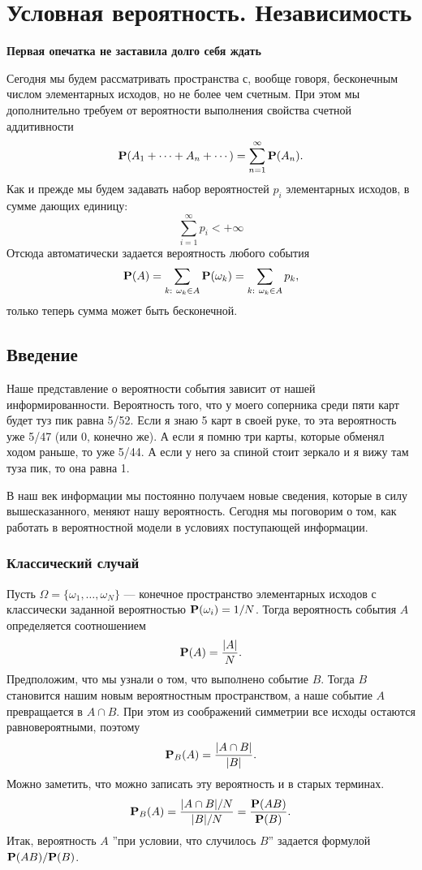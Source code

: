 \documentclass[11 pt,russian]{article}
\begin{document}
\newenvironment{enumerate*}%
  {\begin{enumerate}%
    \setlength{\itemsep}{1pt}%
    \setlength{\parskip}{1pt}}%
  {\end{enumerate}}
  \newtheorem{Th}{Теорема}
    \newtheorem{Lemm}{Лемма}
  \theoremstyle{definition}
  \newtheorem{Rem}{Замечание}
  \newtheorem{Que}{Вопрос}
  \newtheorem{Exam}{Пример}
    \newtheorem{Def}{Определение}
\section{Условная вероятность. Независимость}
{\bf Первая опечатка не заставила долго себя ждать}

Сегодня мы будем рассматривать пространства с, вообще говоря, бесконечным числом элементарных исходов, но не более чем счетным. 
При этом мы дополнительно требуем от вероятности выполнения свойства счетной аддитивности
$$
{\bf P}(A_1 + \dotsb + A_n +\dotsb) = \sum_{n=1}^{\infty} {\bf P}(A_n). 
$$
Как и прежде мы будем задавать набор вероятностей $p_i$ элементарных исходов, в сумме дающих единицу:
$$
\sum_{i=1}^{\infty} p_i < +\infty
$$
Отсюда автоматически задается вероятность любого события
$$
{\bf P}(A) = \sum_{k:\ \omega_k\in A} {\bf P}(\omega_k) = \sum_{k:\ \omega_k\in A} p_k,
$$
только теперь сумма может быть бесконечной.
\subsection{Введение}
Наше представление о вероятности события зависит от нашей информированности. Вероятность того, что у моего соперника среди пяти карт будет туз пик равна 5/52. Если я знаю 5 карт в своей руке, то эта вероятность уже 5/47 (или 0, конечно же). А если я помню три карты, которые обменял ходом раньше, то уже 5/44. А если у него за спиной стоит зеркало и я вижу там туза пик, то она равна 1. 

В наш век информации мы постоянно получаем новые сведения, которые в силу вышесказанного, меняют нашу вероятность. Сегодня мы поговорим о том, как работать в вероятностной модели в условиях поступающей информации.
\subsubsection{Классический случай}
Пусть $\Omega=\{\omega_1,\dotsc,\omega_N\}$ --- конечное пространство элементарных исходов с классически заданной вероятностью ${\bf P}(\omega_i) = 1/N$. Тогда вероятность события $A$ определяется соотношением
$$
{\bf P}(A) = \frac{|A|}{N}.
$$
Предположим, что мы узнали о том, что выполнено событие $B$. Тогда $B$ становится нашим новым вероятностным пространством, а наше событие $A$ превращается в $A\cap B$. При этом из соображений симметрии все исходы остаются равновероятными, поэтому
$$
{\bf P}_B(A) = \frac{|A\cap B|}{|B|}.
$$ 
Можно заметить, что можно записать эту вероятность и в старых терминах.
$$
{\bf P}_{B}(A) =  \frac{|A\cap B|/N}{|B|/N} =  \frac{{\bf P}(AB)}{{\bf P}(B)}.
$$
Итак, вероятность $A$ ''при условии, что случилось $B$'' задается формулой ${\bf P}(AB)/{\bf P}(B)$.
\end{document}
